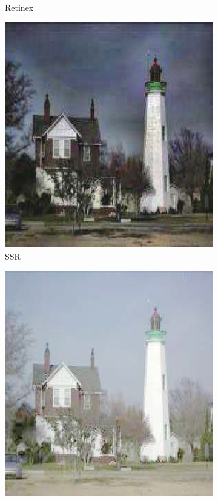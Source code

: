 \documentclass[a4paper, 10pt]{article}
\begin{document}
\begin{figure}[htb]
\begin{subfigure}{0.18\textwidth}
			\captionsetup{font=scriptsize}
			\caption{Retinex\cite{cooper2004analysis}}
			\label{fig: Retinex Model_Retinex}
		\end{subfigure}
		\begin{subfigure}{0.18\textwidth}
			\includegraphics[width=\linewidth]{picture/LLIE/Retinex Model/SSR}
			\captionsetup{font=scriptsize}
			\caption{SSR}
			\label{fig: Retinex Model_SSR}	
		\end{subfigure}
		\begin{subfigure}{0.18\textwidth}
			\includegraphics[width=\linewidth]{picture/LLIE/Retinex Model/MSR}

\end{subfigure}
\end{figure}
\end{document}
